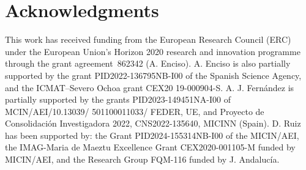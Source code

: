 \documentclass[11pt,oneside]{amsart}
\theoremstyle{definition}
\numberwithin{equation}{section}
\begin{document}
 


\section*{Acknowledgments}  
This work has received funding from the European Research Council (ERC) under the European Union's Horizon 2020 research and innovation programme through the grant agreement~862342 (A. Enciso). A. Enciso is also partially supported by the grant PID2022-136795NB-I00 of the Spanish Science Agency, and the ICMAT--Severo Ochoa grant CEX20 19-000904-S. A. J. Fern\'andez is partially supported by the grants PID2023-149451NA-I00 of MCIN/AEI/10.13039/ 501100011033/ FEDER, UE, and Proyecto de Consolidaci\'on Investigadora 2022, CNS2022-135640, MICINN (Spain). D. Ruiz has been supported by: the Grant PID2024-155314NB-I00 of the MICIN/AEI, the IMAG-Maria de Maeztu Excellence Grant CEX2020-001105-M funded by MICIN/AEI, and the Research Group FQM-116 funded by J. Andaluc\'ia.
\end{document}
